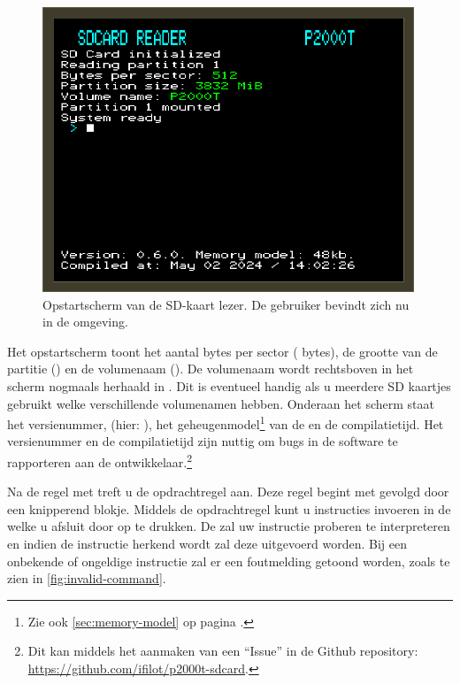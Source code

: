 \begin{figure}[h!]
    \centering
    \includegraphics[width=0.99\textwidth]{img/boot.png}
    \caption{Opstartscherm van de SD-kaart lezer. De gebruiker bevindt zich nu in de \launcher omgeving.}
    \label{fig:screenshot-boot}
\end{figure}


Het opstartscherm toont het aantal bytes per sector ( bytes), de grootte van de partitie () en de volumenaam (). De volumenaam wordt rechtsboven in het scherm nogmaals herhaald in . Dit is eventueel handig als u meerdere SD kaartjes gebruikt welke verschillende volumenamen hebben. Onderaan het scherm staat het versienummer, (hier: ), het geheugenmodel\footnote{Zie ook \cref{sec:memory-model} op pagina \pageref{sec:memory-model}.} van de \pc en de compilatietijd. Het versienummer en de compilatietijd zijn nuttig om bugs in de software te rapporteren aan de ontwikkelaar.\footnote{Dit kan middels het aanmaken van een ``Issue'' in de Github repository: \url{https://github.com/ifilot/p2000t-sdcard}.}

Na de regel met  treft u de opdrachtregel aan. Deze regel begint met \pkc{>} gevolgd door een knipperend blokje. Middels de opdrachtregel kunt u instructies invoeren in de \pc welke u afsluit door op  te drukken. De \product zal uw instructie proberen te interpreteren en indien de instructie herkend wordt zal deze uitgevoerd worden. Bij een onbekende of ongeldige instructie zal er een foutmelding getoond worden, zoals te zien in \cref{fig:invalid-command}.


